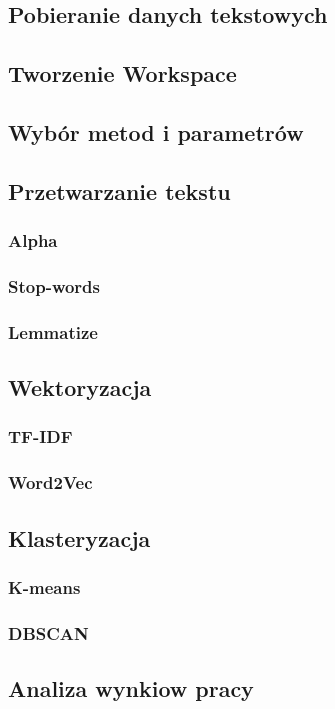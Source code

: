 	\subsection{Pobieranie danych tekstowych}

	\subsection{Tworzenie Workspace}

	\subsection{Wybór metod i parametrów} 

		
	\subsection{Przetwarzanie tekstu} 


		
		\subsubsection{Alpha}

				
				
		\subsubsection{Stop-words}

			
		\subsubsection{Lemmatize}


			
	\subsection{Wektoryzacja}

	
		\subsubsection{TF-IDF}

			
		\subsubsection{Word2Vec}

	
	
	\subsection{Klasteryzacja}

		\subsubsection{K-means}

		
		\subsubsection{DBSCAN}

	
	\subsection{Analiza wynkiow pracy}
		
		
		

